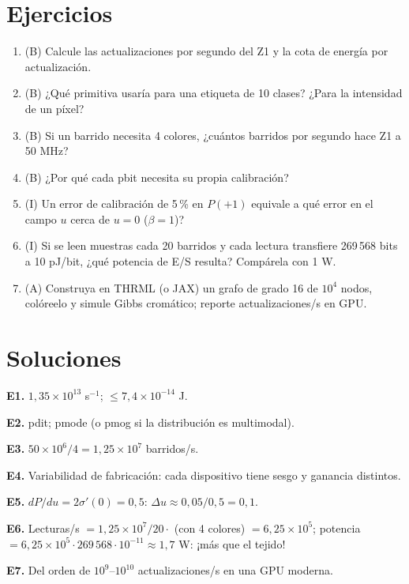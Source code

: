 \documentclass[11pt,a4paper]{article}
\begin{document}
\section{Ejercicios}
\begin{enumerate}[label=\textbf{E\arabic*.}]
\item (B) Calcule las actualizaciones por segundo del Z1 y la cota de energía por actualización.
\item (B) ¿Qué primitiva usaría para una etiqueta de 10 clases? ¿Para la intensidad de un píxel?
\item (B) Si un barrido necesita 4 colores, ¿cuántos barridos por segundo hace Z1 a 50 MHz?
\item (B) ¿Por qué cada pbit necesita su propia calibración?
\item (I) Un error de calibración de 5\,\% en $P(+1)$ equivale a qué error en el campo $u$ cerca de $u=0$ ($\beta=1$)?
\item (I) Si se leen muestras cada 20 barridos y cada lectura transfiere 269\,568 bits a 10 pJ/bit, ¿qué potencia de E/S resulta? Compárela con 1 W.
\item (A) Construya en THRML (o JAX) un grafo de grado 16 de $10^4$ nodos, colóreelo y simule Gibbs cromático; reporte actualizaciones/s en GPU.
\end{enumerate}
\section{Soluciones}
\begin{solucion}
\textbf{E1.} $1{,}35\times10^{13}$ s$^{-1}$; $\le7{,}4\times10^{-14}$ J.

\textbf{E2.} pdit; pmode (o pmog si la distribución es multimodal).

\textbf{E3.} $50\times10^6/4=1{,}25\times10^7$ barridos/s.

\textbf{E4.} Variabilidad de fabricación: cada dispositivo tiene sesgo y ganancia distintos.

\textbf{E5.} $dP/du=2\sigma'(0)=0{,}5$: $\Delta u\approx0{,}05/0{,}5=0{,}1$.

\textbf{E6.} Lecturas/s $=1{,}25\times10^7/20\cdot$ (con 4 colores) $=6{,}25\times10^5$; potencia $=6{,}25\times10^5\cdot269\,568\cdot10^{-11}\approx1{,}7$ W: ¡más que el tejido!

\textbf{E7.} Del orden de $10^{9}$--$10^{10}$ actualizaciones/s en una GPU moderna.
\end{solucion}
\end{document}
